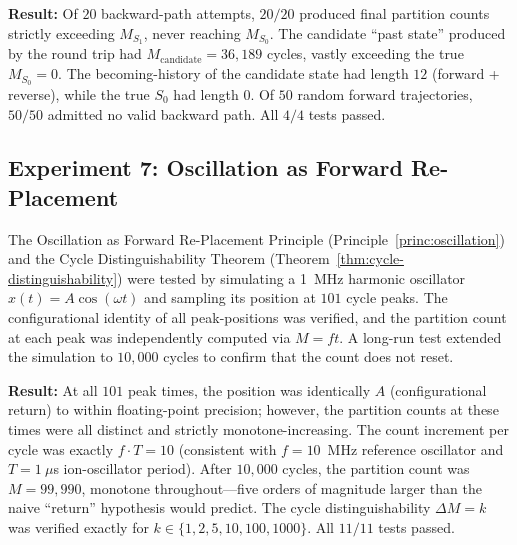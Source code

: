 \documentclass[twocolumn,10pt,a4paper]{article}
\theoremstyle{definition}
\theoremstyle{remark}
\begin{document}
\textbf{Result:} Of $20$ backward-path attempts, $20/20$ produced final partition counts strictly exceeding $M_{S_1}$, never reaching $M_{S_0}$. The candidate ``past state'' produced by the round trip had $M_{\mathrm{candidate}} = 36{,}189$ cycles, vastly exceeding the true $M_{S_0} = 0$. The becoming-history of the candidate state had length $12$ (forward + reverse), while the true $S_0$ had length $0$. Of $50$ random forward trajectories, $50/50$ admitted no valid backward path. All $4/4$ tests passed.



\subsection{Experiment 7: Oscillation as Forward Re-Placement}
\label{sec:val-E7}

The Oscillation as Forward Re-Placement Principle (Principle~\ref{princ:oscillation}) and the Cycle Distinguishability Theorem (Theorem~\ref{thm:cycle-distinguishability}) were tested by simulating a 1~MHz harmonic oscillator $x(t) = A\cos(\omega t)$ and sampling its position at $101$ cycle peaks. The configurational identity of all peak-positions was verified, and the partition count at each peak was independently computed via $M = ft$. A long-run test extended the simulation to $10{,}000$ cycles to confirm that the count does not reset.

\textbf{Result:} At all $101$ peak times, the position was identically $A$ (configurational return) to within floating-point precision; however, the partition counts at these times were all distinct and strictly monotone-increasing. The count increment per cycle was exactly $f \cdot T = 10$ (consistent with $f = 10$~MHz reference oscillator and $T = 1~\mu$s ion-oscillator period). After $10{,}000$ cycles, the partition count was $M = 99{,}990$, monotone throughout---five orders of magnitude larger than the naive ``return'' hypothesis would predict. The cycle distinguishability $\Delta M = k$ was verified exactly for $k \in \{1, 2, 5, 10, 100, 1000\}$. All $11/11$ tests passed.
\end{document}
